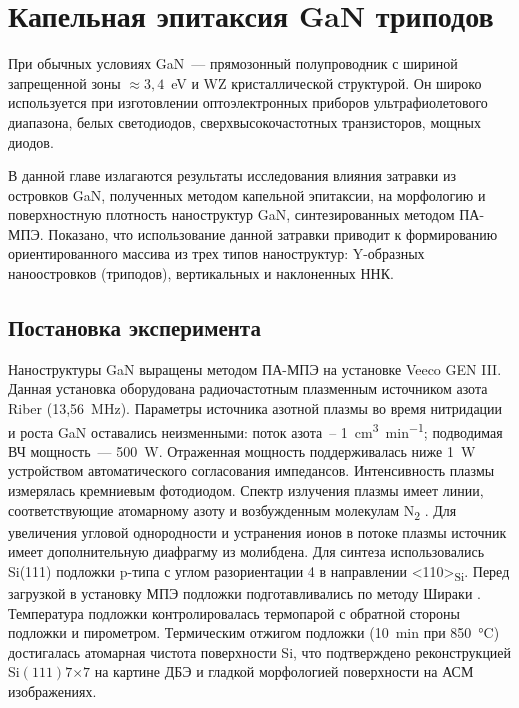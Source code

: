 \chapter{Капельная эпитаксия GaN триподов}\label{ch:ch3}

При обычных условиях GaN~--- прямозонный полупроводник с шириной запрещенной зоны \(\approx 3,4\)~\si{\electronvolt} и WZ кристаллической структурой. Он широко используется при изготовлении оптоэлектронных приборов ультрафиолетового диапазона, белых светодиодов, сверхвысокочастотных транзисторов, мощных диодов.

В данной главе излагаются результаты исследования влияния затравки из островков GaN, полученных методом капельной эпитаксии, на морфологию и поверхностную плотность наноструктур GaN, синтезированных методом ПА-МПЭ. Показано, что использование данной затравки \cite{Debnath2009, Yu2014} приводит к формированию ориентированного массива из трех типов наноструктур: Y-образных наноостровков (триподов), вертикальных и наклоненных ННК.

\section{Постановка эксперимента}\label{sec:ch3/sec1}

Наноструктуры GaN выращены методом ПА-МПЭ на установке Veeco GEN III. Данная установка оборудована радиочастотным плазменным источником азота Riber (13,56~\si{\mega\hertz}). Параметры источника азотной плазмы во время нитридации и роста GaN оставались неизменными: поток азота~-- 1~\si{\centi\meter^3\per\minute}; подводимая ВЧ мощность~--- 500~\si{\watt}. Отраженная мощность поддерживалась ниже 1~\si{\watt} устройством автоматического согласования импедансов. Интенсивность плазмы измерялась кремниевым фотодиодом. Спектр излучения плазмы имеет линии, соответствующие атомарному азоту и возбужденным молекулам N\textsubscript{2} \cite{Debnath2016}. Для увеличения угловой однородности и устранения ионов в потоке плазмы источник имеет дополнительную диафрагму из молибдена. Для синтеза использовались Si(111) подложки p-типа с углом разориентации 4{\textdegree} в направлении <110>\textsubscript{Si}. Перед загрузкой в установку МПЭ подложки подготавливались по методу Шираки \cite{Ishizaka2019}. Температура подложки контролировалась термопарой с обратной стороны подложки и пирометром. Термическим отжигом подложки (10~\si{\minute} при 850~\si{\degreeCelsius}) достигалась атомарная чистота поверхности Si, что подтверждено реконструкцией Si\((111)7\)\(\times\)\(7\) на картине ДБЭ и гладкой морфологией поверхности на АСМ изображениях.

